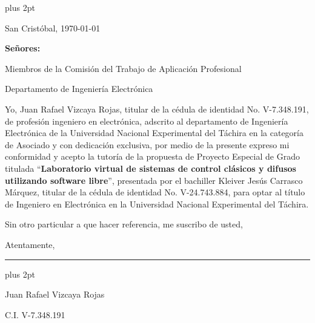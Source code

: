 % 

\begin{titlepage}
\parskip=7.25pt plus 2pt
\setcounter{page}{3}
\begin{flushright}
	San Cristóbal, \today
\end{flushright}

\vspace{1cm}
\vfill

\begin{flushleft}
		\singlespacing
		
		\setlength{\parskip}{0pt}
		
		\textbf{Señores:}
		
		Miembros de la Comisión del Trabajo de Aplicación Profesional
		
		Departamento de Ingeniería Electrónica
		
\end{flushleft}

\vfill
\begin{spacing}{1.5}
	Yo, Juan Rafael Vizcaya Rojas, titular de la cédula de identidad No. \mbox{V-7.348.191}, de profesión ingeniero en electrónica, adscrito al departamento de Ingeniería Electrónica de la Universidad Nacional Experimental del Táchira en la categoría de Asociado y con dedicación exclusiva, por medio de la presente expreso mi conformidad y acepto la tutoría de la propuesta de Proyecto Especial de Grado titulada \enquote{\textbf{Laboratorio virtual de sistemas de control clásicos y difusos utilizando software libre}}, presentada por el bachiller Kleiver Jesús Carrasco Márquez, titular de la cédula de identidad No. \mbox{V-24.743.884}, para optar al título de Ingeniero en Electrónica en la Universidad Nacional Experimental del Táchira.
	
	Sin otro particular a que hacer referencia, me suscribo de usted,
	
	\setlength{\parskip}{20pt} 
	
	\noindent Atentamente,
\end{spacing}

\vfill

\begin{center}
	
	\rule{6cm}{1pt}
	
	\vspace{0.2cm}
	
	\parskip=0pt plus 2pt
    
    \begin{spacing}{1}    
        Juan Rafael Vizcaya Rojas
    
        C.I. V-7.348.191
    \end{spacing}
\end{center}

\vspace{0.5cm}

\end{titlepage}